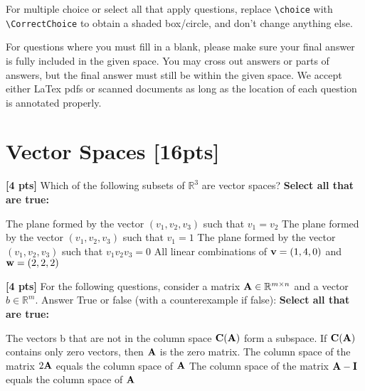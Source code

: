 \documentclass[11pt,addpoints,answers]{exam}
\numberwithin{equation}{section} %
\numberwithin{figure}{section} %
\numberwithin{table}{section} %
\begin{document}
For multiple choice or select all that apply questions, replace \lstinline{\choice} with \lstinline{\CorrectChoice} to obtain a shaded box/circle, and don't change anything else.


For questions where you must fill in a blank, please make sure your final answer is fully included in the given space. You may cross out answers or parts of answers, but the final answer must still be within the given space. We accept either LaTex pdfs or scanned documents as long as the location of each question is annotated properly.


\clearpage

\section{Vector Spaces  [16pts]}
\begin{questions}

\question \textbf{[4 pts]} Which of the following subsets of $\mathbb{R}^3$ are vector spaces?
    \textbf{Select all that are true:} 
    \checkboxchar{$\Box$} \checkedchar{$\blacksquare$}
    \begin{checkboxes}
        \choice The plane formed by the vector $(v_1, v_2, v_3) $ such that $v_1 = v_2$
        \choice The plane formed by the vector $(v_1, v_2, v_3) $ such that $v_1 = 1$
        \choice The plane formed by the vector $(v_1, v_2, v_3) $  such that $v_1 v_2 v_3 = 0$
        \choice All linear combinations of $\mathbf{v} = (1, 4, 0)$ and $\mathbf{w} = (2, 2, 2)$
    \end{checkboxes}

\question \textbf{[4 pts]} For the following questions, consider a matrix $\mathbf{A} \in \mathbb{R}^{m \times n}$ and a vector $b \in \mathbb{R}^m$. Answer True or false (with a counterexample if false):
    \textbf{Select all that are true:} 
    \begin{checkboxes}
        \choice The vectors b that are not in the column space $\mathbf{C}(\mathbf{A})$ form a subspace.
        \choice If $\mathbf{C}(\mathbf{A})$ contains only zero vectors, then $\mathbf{A}$ is the zero matrix.
        \choice The column space of the matrix $2\mathbf{A}$ equals the column space of $\mathbf{A}$
        \choice The column space of the matrix $\mathbf{A} - \mathbf{I}$ equals the column space of $\mathbf{A}$
    \end{checkboxes}
    \begin{tcolorbox}[fit,height=3cm, width=\textwidth, blank, borderline={0.5pt}{-2pt},halign=center, valign=center, nobeforeafter]
    \end{tcolorbox}


\end{questions}
\end{document}

